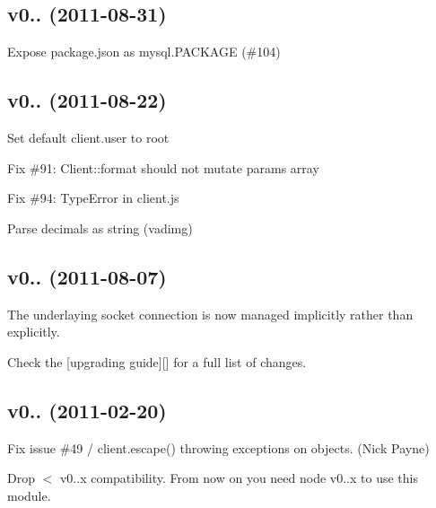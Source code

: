 \subsection*{v0.. (2011-\/08-\/31)}


\begin{DoxyItemize}
\item Expose package.\+json as {\ttfamily mysql.\+P\+A\+C\+K\+A\+G\+E} (\#104)
\end{DoxyItemize}

\subsection*{v0.. (2011-\/08-\/22)}


\begin{DoxyItemize}
\item Set default {\ttfamily client.\+user} to root
\item Fix \#91\+: Client\+::format should not mutate params array
\item Fix \#94\+: Type\+Error in client.\+js
\item Parse decimals as string (vadimg)
\end{DoxyItemize}

\subsection*{v0.. (2011-\/08-\/07)}


\begin{DoxyItemize}
\item The underlaying socket connection is now managed implicitly rather than explicitly.
\item Check the \mbox{[}upgrading guide\mbox{]}\mbox{[}\mbox{]} for a full list of changes.
\end{DoxyItemize}

\subsection*{v0.. (2011-\/02-\/20)}


\begin{DoxyItemize}
\item Fix issue \#49 / {\ttfamily client.\+escape()} throwing exceptions on objects. (Nick Payne)
\item Drop $<$ v0..\+x compatibility. From now on you need node v0..\+x to use this module.
\end{DoxyItemize}

